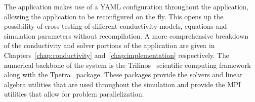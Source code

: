 The application makes use of a YAML configuration throughout the application, allowing the application to be reconfigured on the fly. This opens up the possibility of cross-testing of different conductivity models, equations and simulation parameters without recompilation. A more comprehensive breakdown of the conductivity and solver portions of the application are given in Chapters~\ref{chap:conductivity} and~\ref{chap:implementation} respectively. The numerical backbone of the system is the Trilinos~\citep{TrilinosPaper} scientific computing framework along with the Tpetra~\citep{TpetraPaper} package. These packages provide the solvers and linear algebra utilities that are used throughout the simulation and provide the MPI utilities that allow for problem parallelization.

